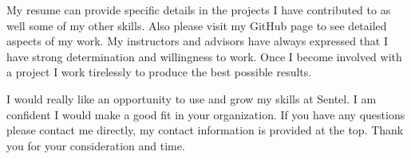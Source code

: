 \documentclass[10pt,a4paper,sans]{moderncv}        %
\begin{document}
My resume can provide specific details in the projects I have contributed to as well some of my
other skills. Also please visit my GitHub page to see detailed aspects of my work.  My instructors 
and advisors have always expressed that I have strong determination and willingness to work. Once I 
become involved with a project I work tirelessly to produce the best possible results.

I would really like an opportunity to use and grow my skills at Sentel. I am confident I would
make a good fit in your organization. If you have any questions please contact me directly, my
contact information is provided at the top. Thank you for your consideration and time.

\makeletterclosing
\end{document}
